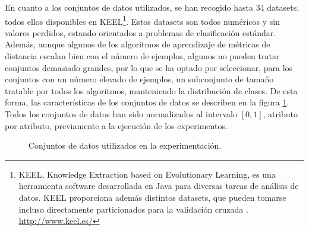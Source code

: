 En cuanto a los conjuntos de datos utilizados, se han recogido hasta 34 datasets, todos ellos disponibles en KEEL\footnote{KEEL, Knowledge Extraction based on Evolutionary Learning, es una herramienta software desarrollada en Java para diversas tareas de análisis de datos. KEEL proporciona además distintos datasets, que pueden tomarse incluso directamente particionados para la validación cruzada \cite{keel}. \url{http://www.keel.es/}}. Estos datasets son todos numéricos y sin valores perdidos, estando orientados a problemas de clasificación estándar. Además, aunque algunos de los algoritmos de aprendizaje de métricas de distancia escalan bien con el número de ejemplos, algunos no pueden tratar conjuntos demasiado grandes, por lo que se ha optado por seleccionar, para los conjuntos con un número elevado de ejemplos, un subconjunto de tamaño tratable por todos los algoritmos, manteniendo la distribución de clases. De esta forma, las características de los conjuntos de datos se describen en la figura \ref{fig:exp:datasets}. Todos los conjuntos de datos han sido normalizados al intervalo $[0,1]$, atributo por atributo, previamente a la ejecución de los experimentos.

\begin{figure}[h]
\centering
\resizebox{0.7\textwidth}{!}{%
    
}
\caption{Conjuntos de datos utilizados en la experimentación.} \label{fig:exp:datasets}
\end{figure}

